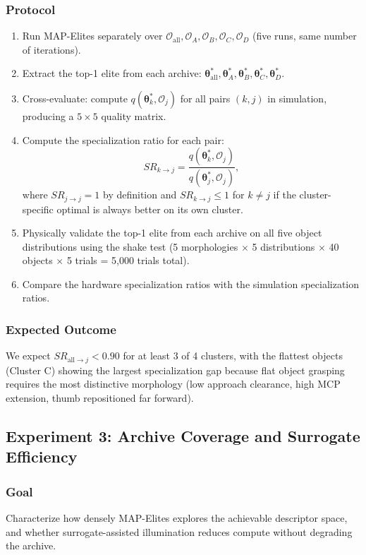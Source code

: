 \documentclass[journal]{IEEEtran}
\newcommand{\btheta}{\boldsymbol{\theta}}
\newcommand{\cO}{\mathcal{O}}
\begin{document}
\subsubsection{Protocol}
\begin{enumerate}
  \item Run MAP-Elites separately over $\cO_{\text{all}}, \cO_A, \cO_B, \cO_C, \cO_D$
    (five runs, same number of iterations).
  \item Extract the top-1 elite from each archive:
    $\btheta^*_{\text{all}}, \btheta^*_A, \btheta^*_B, \btheta^*_C, \btheta^*_D$.
  \item Cross-evaluate: compute $q(\btheta^*_k, \cO_j)$ for all pairs $(k, j)$ in simulation,
    producing a $5\times5$ quality matrix.
  \item Compute the specialization ratio for each pair:
    \begin{equation}
      SR_{k \to j} = \frac{q(\btheta^*_k, \cO_j)}{q(\btheta^*_j, \cO_j)},
      \label{eq:sr}
    \end{equation}
    where $SR_{j \to j} = 1$ by definition and $SR_{k \to j} \leq 1$ for $k \neq j$
    if the cluster-specific optimal is always better on its own cluster.
  \item Physically validate the top-1 elite from each archive on all five object
    distributions using the shake test (5 morphologies $\times$ 5 distributions
    $\times$ 40 objects $\times$ 5 trials = 5,000 trials total).
  \item Compare the hardware specialization ratios with the simulation specialization
    ratios.
\end{enumerate}

\subsubsection{Expected Outcome}
We expect $SR_{\text{all} \to j} < 0.90$ for at least 3 of 4 clusters,
with the flattest objects (Cluster C) showing the largest specialization gap because
flat object grasping requires the most distinctive morphology (low approach clearance,
high MCP extension, thumb repositioned far forward).

\subsection{Experiment 3: Archive Coverage and Surrogate Efficiency}

\subsubsection{Goal}
Characterize how densely MAP-Elites explores the achievable descriptor space, and whether
surrogate-assisted illumination reduces compute without degrading the archive.
\end{document}
